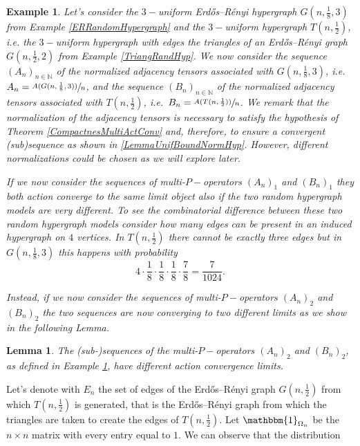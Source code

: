 \documentclass[11pt]{article}
\newtheorem{lemma}[theorem]{Lemma}
\newtheorem{example}[theorem]{Example}
\def\N{\mathbb{N}}
\begin{document}
\begin{example}\label{ExamCompERHyp}
    Let's consider the $3-$uniform Erdős–Rényi hypergraph $G(n,\frac{1}{8},3)$ from Example \ref{ERRandomHypergraph} and the $3-$uniform hypergraph $T(n,\frac{1}{2})$, i.e. the $3-$uniform hypergraph with edges the triangles of an Erdős–Rényi graph $G(n,\frac{1}{2},2)$ from Example \ref{TriangRandHyp}. We now consider the sequence $(A_n)_{n\in \mathbb{N}}$ of the normalized adjacency tensors associated with $G(n,\frac{1}{8},3)$, i.e.\  $A_n=\sfrac{A(G(n,\frac{1}{8},3))}{n}$, and the sequence $(B_n)_{n\in \N}$ of the normalized adjacency tensors associated with $T(n,\frac{1}{2})$, i.e.\ $B_n=\sfrac{A(T(n,\frac{1}{2}))}{n}$. We remark that the normalization of the adjacency tensors is necessary to satisfy the hypothesis of Theorem \ref{CompactnesMultiActConv} and, therefore, to ensure a convergent (sub)sequence as shown in \ref{LemmaUnifBoundNormHyp}. However, different normalizations could be chosen as we will explore later.

If we now consider the sequences of multi-$P-$operators $(A_n)_1$ and $(B_n)_1$ they both action converge to the same limit object also if the two random hypergraph models are very different. To see the combinatorial difference between these two random hypergraph models consider how many edges can be present in an induced hypergraph on $4$ vertices. In $T(n,\frac{1}{2})$ there cannot be exactly three edges but in $G(n,\frac{1}{8},3)$ this happens with probability $$4\cdot \frac{1}{8}\cdot \frac{1}{8}\cdot \frac{1}{8}\cdot \frac{7}{8}=\frac{7}{1024}.$$

Instead, if we now consider the sequences of multi-$P-$operators $(A_n)_2$ and $(B_n)_2$ the two sequences are now converging to two different limits as we show in the following Lemma. 
\end{example}

\begin{lemma}\label{LemmaDiffLimitERHTriangER}
The (sub-)sequences of the multi-$P-$operators $(A_n)_2$ and $(B_n)_2$, as defined in Example \ref{ExamCompERHyp}, have different action convergence limits.
\end{lemma}


\proof
Let's denote with $E_n$ the set of edges of the Erdős–Rényi graph $G(n,\frac{1}{2})$ from which $T(n,\frac{1}{2})$ is generated, that is the Erdős–Rényi graph from which the triangles are taken to create the edges of $T(n,\frac{1}{2})$.
Let $\mathbbm{1}_{\Omega_n}$ be the $n \times n$ matrix with every entry equal to $1$.  We can observe that the distribution
\end{document}

